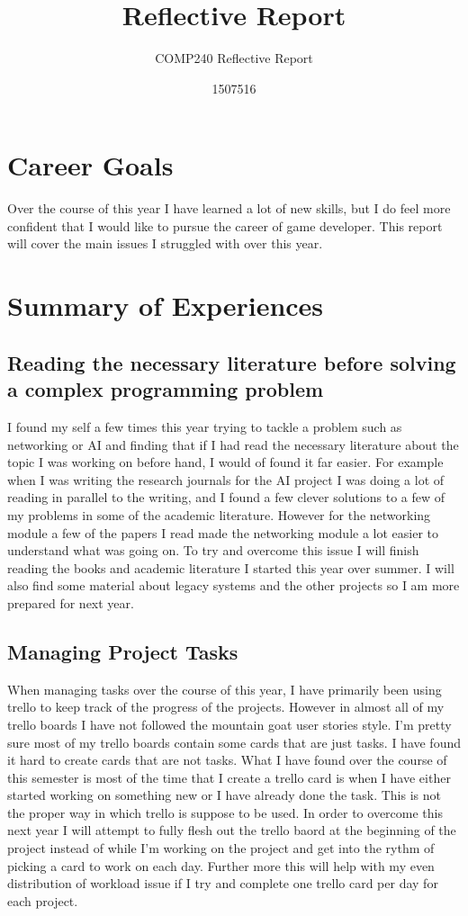 \documentclass{scrartcl}
\title{Reflective Report}
\subtitle{COMP240 Reflective Report}
\author{1507516}
\begin{document}
\maketitle


\section{Career Goals}
Over the course of this year I have learned a lot of new skills, but I do feel more confident that I would like to pursue the career of game developer.
This report will cover the main issues I struggled with over this year.


\section{Summary of Experiences}
\subsection{Reading the necessary literature before solving a complex programming problem}
I found my self a few times this year trying to tackle a problem such as networking or AI and finding that if I had read the necessary literature about the topic I was working on before hand, I would of found it far easier. For example when I was writing the research journals for the AI project I was doing a lot of reading in parallel to the writing, and I found a few clever solutions to a few of my problems in some of the academic literature. However for the networking module a few of the papers I read made the networking module a lot easier to understand what was going on.
To try and overcome this issue I will finish reading the books and academic literature I started this year over summer. I will also find some material about legacy systems and the other projects so I am more prepared for next year.

\subsection{Managing Project Tasks}
When managing tasks over the course of this year, I have primarily been using trello to keep track of the progress of the projects. However in almost all of my trello boards I have not followed the mountain goat user stories style. I'm pretty sure most of my trello boards contain some cards that are just tasks. I have found it hard to create cards that are not tasks. What I have found over the course of this semester is most of the time that I create a trello card is when I have either started working on something new or I have already done the task. This is not the proper way in which trello is suppose to be used.
In order to overcome this next year I will attempt to fully flesh out the trello baord at the beginning of the project instead of while I'm working on the project and get into the rythm of picking a card to work on each day. Further more this will help with my even distribution of workload issue if I try and complete one trello card per day for each project.
\end{document}
